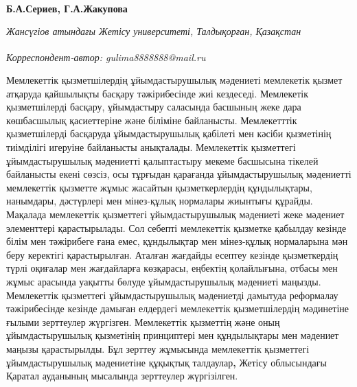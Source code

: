 
\begin{articleheader}

{\bfseries
Б.А.Сериев,
Г.А.Жакупова\textsuperscript{\envelope } }
\end{articleheader}

\begin{affiliation}
\emph{Жансүгіов атындағы Жетісу университеті, Талдықорған, Қазақстан}

\raggedright \textsuperscript{\envelope }{\em Корреспондент-автор: gulima8888888@mail.ru}
\end{affiliation}

Мемлекеттік қызметшілердің ұйымдастырушылық мәдениеті мемлекетік қызмет
атқаруда қайшылықты басқару тәжірибесінде жиі кездеседі. Мемлекетік
қызметшілерді басқару, ұйымдастыру саласында басшының жеке дара
көшбасшылық қасиеттеріне және біліміне байланысты. Мемлекетттік
қызметшілерді басқаруда ұйымдастырушылық қабілеті мен кәсіби қызметінің
тиімділігі игеруіне байланысты анықталады. Мемлекеттік қызметтегі
ұйымдастырушылық мәдениетті қалыптастыру мекеме басшысына тікелей
байланысты екені сөзсіз, осы тұрғыдан қарағанда ұйымдастырушылық
мәдениетті мемлекеттік қызметте жұмыс жасайтын қызметкерлердің
құндылықтары, нанымдары, дәстүрлері мен мінез-құлық нормалары жиынтығы
құрайды. Мақалада мемлекеттік қызметтегі ұйымдастырушылық мәдениеті жеке
мәдениет элементтері қарастырылады. Сол себепті мемлекеттік қызметке
қабылдау кезінде білім мен тәжірибеге ғана емес, құндылықтар мен
мінез-құлық нормаларына мән беру керектігі қарастырылған. Аталған
жағдайды есептеу кезінде қызметкердің түрлі оқиғалар мен жағдайларға
көзқарасы, еңбектің қолайлығына, отбасы мен жұмыс арасында уақытты
бөлуде ұйымдастырушылық мәдениеті маңызды. Мемлекеттік қызметтегі
ұйымдастырушылық мәдениетді дамытуда реформалау тәжірибесінде кезінде
дамыған елдердегі мемлекеттік қызметшілердің мәдинетіне ғылыми
зерттеулер жүргізген. Мемлекеттік қызметтің және оның ұйымдастырушылық
қызметінің принциптері мен құндылықтары мен мәдениет маңызы
қарастырылды. Бұл зерттеу жұмысында мемлекеттік қызметтегі
ұйымдастырушылық мәдениетіне құқықтық талдаулар{\bfseries ,} Жетісу
облысындағы Қаратал ауданының мысалында зерттеулер жүргізілген.

